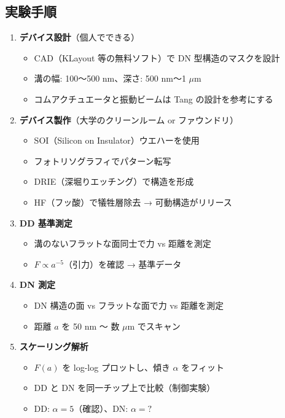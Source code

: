 \documentclass[12pt,a4paper]{article}
\begin{document}
\subsection{実験手順}
\begin{expbox}[ステップバイステップ]
\begin{enumerate}
\item \textbf{デバイス設計}（個人でできる）
  \begin{itemize}
  \item CAD（KLayout 等の無料ソフト）で DN 型構造のマスクを設計
  \item 溝の幅: 100〜500 nm、深さ: 500 nm〜1 $\mu$m
  \item コムアクチュエータと振動ビームは Tang の設計を参考にする
  \end{itemize}

\item \textbf{デバイス製作}（大学のクリーンルーム or ファウンドリ）
  \begin{itemize}
  \item SOI（Silicon on Insulator）ウエハーを使用
  \item フォトリソグラフィでパターン転写
  \item DRIE（深堀りエッチング）で構造を形成
  \item HF（フッ酸）で犠牲層除去 → 可動構造がリリース
  \end{itemize}

\item \textbf{DD 基準測定}
  \begin{itemize}
  \item 溝のないフラットな面同士で力 vs 距離を測定
  \item $F \propto a^{-5}$（引力）を確認 → 基準データ
  \end{itemize}

\item \textbf{DN 測定}
  \begin{itemize}
  \item DN 構造の面 vs フラットな面で力 vs 距離を測定
  \item 距離 $a$ を 50 nm 〜 数 $\mu$m でスキャン
  \end{itemize}

\item \textbf{スケーリング解析}
  \begin{itemize}
  \item $F(a)$ を log-log プロットし、傾き $\alpha$ をフィット
  \item DD と DN を同一チップ上で比較（制御実験）
  \item DD: $\alpha = 5$（確認）、DN: $\alpha = ?$
  \end{itemize}
\end{enumerate}
\end{expbox}
\end{document}
